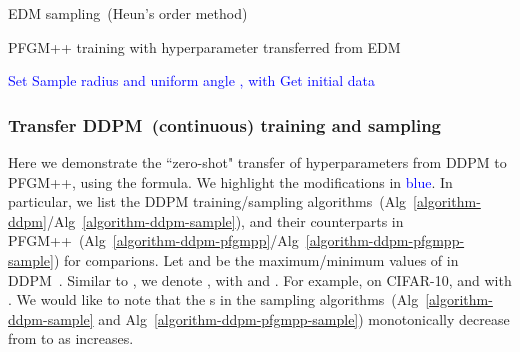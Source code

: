 \begin{minipage}{0.46\textwidth}
\vspace{-47pt}
\begin{algorithm}[H]
    \centering
    \caption{EDM sampling~(Heun’s  order method)}\label{algorithm-edm-sample}
    \begin{algorithmic}[1]
\STATE 
\FOR{}
\STATE 
\STATE 
\IF{}
\STATE 
\STATE 
\ENDIF
\ENDFOR
    \end{algorithmic}
\end{algorithm}
\end{minipage}
\hfill
\begin{minipage}{0.50\textwidth}
\begin{algorithm}[H]
    \centering
    \caption{PFGM++ training with hyperparameter transferred from EDM}\label{algorithm-edm-pfgmpp-sample}
    \begin{algorithmic}[1]
 \STATE \textcolor{blue}{Set  }
        \STATE  \textcolor{blue}{Sample radius 
       and uniform angle , with }
        \STATE \textcolor{blue}{Get initial data }
\FOR{}
\STATE 
\STATE 
\IF{}
\STATE 
\STATE 
\ENDIF
\ENDFOR
    \end{algorithmic}
\end{algorithm}
\end{minipage}

\subsubsection{Transfer DDPM~(continuous) training and sampling}

Here we demonstrate the ``zero-shot" transfer of hyperparameters from DDPM to PFGM++, using the  formula. We highlight the modifications in \textcolor{blue}{blue}. In particular, we list the DDPM training/sampling algorithms~(Alg~\ref{algorithm-ddpm}/Alg~\ref{algorithm-ddpm-sample}), and their counterparts in PFGM++~(Alg~\ref{algorithm-ddpm-pfgmpp}/Alg~\ref{algorithm-ddpm-pfgmpp-sample}) for comparions. Let  and  be the maximum/minimum values of  in DDPM~\cite{Ho2020DenoisingDP}. Similar to \citet{Song2021ScoreBasedGM}, we denote , with  and . For example, on CIFAR-10,  and  with . We would like to note that the s in the sampling algorithms~(Alg~\ref{algorithm-ddpm-sample} and Alg~\ref{algorithm-ddpm-pfgmpp-sample}) monotonically decrease from  to  as  increases.

